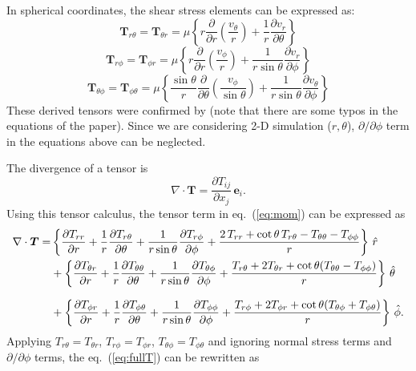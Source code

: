 In spherical coordinates, the shear stress elements can be expressed as:
\begin{equation}
    \boldsymbol{T}_{r\theta}=\boldsymbol{T}_{\theta r} = 
         \mu \left\{ r \frac{\partial}{\partial r} \left( \frac{v_{\theta}}{r} \right) + \frac{1}{r} \frac{\partial v_{r}}{\partial \theta}  \right\}
\end{equation}
\begin{equation}
    \boldsymbol{T}_{r\phi}=\boldsymbol{T}_{\phi r} = 
         \mu \left\{ r \frac{\partial}{\partial r} \left( \frac{v_{\phi}}{r} \right) + \frac{1}{r \sin{\theta}} \frac{\partial v_{r}}{\partial \phi}  \right\}
\end{equation}
\begin{equation}
    \boldsymbol{T}_{\theta\phi}=\boldsymbol{T}_{\phi\theta} = 
         \mu \left\{ \frac{\sin{\theta}}{r} \frac{\partial}{\partial \theta} \left( \frac{v_{\phi}}{\sin{\theta}} \right) + \frac{1}{r \sin{\theta}} \frac{\partial v_{\theta}}{\partial \phi}  \right\}
\end{equation}
These derived tensors were confirmed by \cite{Okuda:97} (note that there are some typos in the equations of the paper). 
Since we are considering 2-D simulation ($r,\theta$), $\partial/\partial{\phi}$ term in the equations above can be neglected.

The divergence of a tensor is 
\begin{equation}
    \nabla \cdot \boldsymbol{T} = \frac{\partial T_{ij}}{\partial x_{j}} \, \boldsymbol{e}_{i}.
\end{equation}
Using this tensor calculus, the tensor term in eq.~(\ref{eq:mom}) can be expressed as
\begin{align}\label{eq:fullT}
    \nabla \cdot \boldsymbol{T} =& 
    \left\{ \frac{\partial T_{rr}}{\partial r} + \frac{1}{r}\frac{\partial T_{r\theta}}{\partial \theta} 
    + \frac{1}{r\sin{\theta}}\frac{\partial T_{r\phi}}{\partial \phi} 
    + \frac{2\,T_{rr}+\cot{\theta}\,T_{r\theta}-T_{\theta\theta}-T_{\phi\phi}}{r}  \right\}\,\hat{r} \\ 
   &+ \left\{ \frac{\partial T_{\theta r}}{\partial r} + \frac{1}{r}\frac{\partial T_{\theta\theta}}{\partial \theta} 
    + \frac{1}{r\sin{\theta}}\frac{\partial T_{\theta\phi}}{\partial \phi} 
    + \frac{T_{r\theta}+2T_{\theta r}+\cot{\theta}(T_{\theta\theta}-T_{\phi\phi})}{r}  \right\}\,\hat{\theta}  \nonumnext
   &+ \left\{ \frac{\partial T_{\phi r}}{\partial r} + \frac{1}{r}\frac{\partial T_{\phi\theta}}{\partial \theta} 
    + \frac{1}{r\sin{\theta}}\frac{\partial T_{\phi\phi}}{\partial \phi} 
    + \frac{T_{r\phi}+2T_{\phi r}+\cot{\theta}(T_{\theta\phi}+T_{\phi\theta})}{r}  \right\}\,\hat{\phi}.  \nonumber 
\end{align}
Applying $T_{r\theta}=T_{\theta r}$, $T_{r\phi}=T_{\phi r}$, $T_{\theta\phi}=T_{\phi\theta}$ and
ignoring normal stress terms and $\partial/\partial \phi$ terms, the eq.~(\ref{eq:fullT}) can be rewritten as

